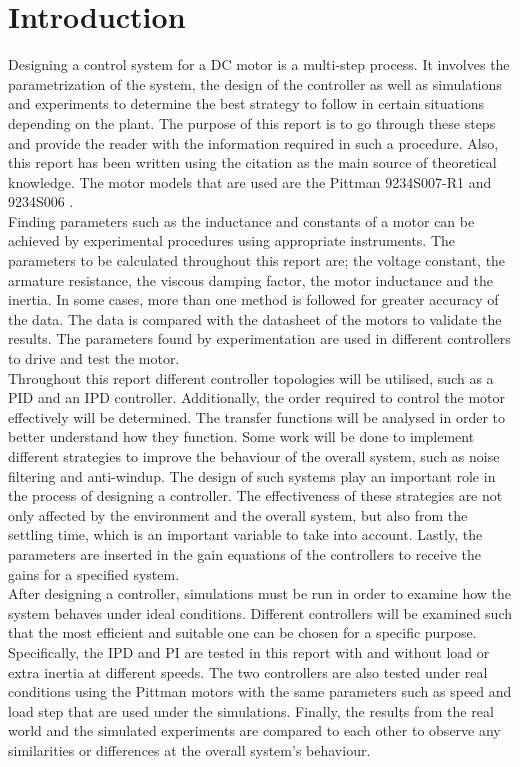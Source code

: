 \section{Introduction}

Designing a control system for a DC motor is a multi-step process. 
It involves the parametrization of the system, the design of the controller as well as simulations and experiments to determine the best strategy to follow in certain situations depending on the plant. 
The purpose of this report is to go through these steps and provide the reader with the information required in such a procedure. 
Also, this report has been written using the citation \cite{feedback} as the main source of theoretical knowledge. 
The motor models that are used are the Pittman 9234S007-R1 and 9234S006 \cite{pittmann}.
\\

Finding parameters such as the inductance and constants of a motor can be achieved by experimental procedures using appropriate instruments. 
The parameters to be calculated throughout this report are; the voltage constant, the armature resistance, the viscous damping factor, the motor inductance and the inertia. 
In some cases, more than one method is followed for greater accuracy of the data. 
The data is compared with the datasheet of the motors to validate the results. 
The parameters found by experimentation are used in different controllers to drive and test the motor. 
\\

Throughout this report different controller topologies will be utilised, such as a PID and an IPD controller. 
Additionally, the order required to control the motor effectively will be determined. 
The transfer functions will be analysed in order to better understand how they function.
Some work will be done to implement different strategies to improve the behaviour of the overall system, such as noise filtering and anti-windup. 
The design of such systems play an important role in the process of designing a controller. 
The effectiveness of these strategies are not only affected by the environment and the overall system, but also from the settling time, which is an important variable to take into account. 
Lastly, the parameters are inserted in the gain equations of the controllers to receive the gains for a specified system.
\\

After designing a controller, simulations must be run in order to examine how the system behaves under ideal conditions. 
Different controllers will be examined such that the most efficient and suitable one can be chosen for a specific purpose. 
Specifically, the IPD and PI are tested in this report with and without load or extra inertia at different speeds. 
The two controllers are also tested under real conditions using the Pittman motors with the same parameters such as speed and load step that are used under the simulations. 
Finally, the results from the real world and the simulated experiments are compared to each other to observe any similarities or differences at the overall system's behaviour.
